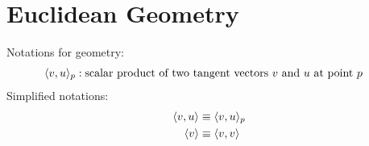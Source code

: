 \section{Euclidean Geometry}



Notations for geometry:
\begin{align}
\langle  v ,  u  \rangle_p  &:
\text{scalar product of two tangent vectors $ v $ and $ u $ at point $ p $}
\end{align}
Simplified notations:
\begin{align}
\langle  v ,  u  \rangle  &\equiv  \langle  v ,  u  \rangle_p\\
\langle  v  \rangle       &\equiv  \langle  v ,  v  \rangle
\end{align}
